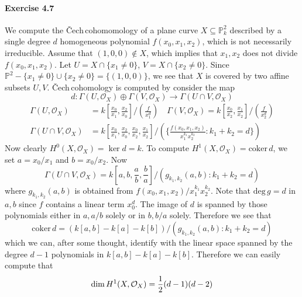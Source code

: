 \documentclass[12pt]{article}
\theoremstyle{plain}
\theoremstyle{definition}
\newcommand{\IP}{\mathbb{P}}
\newcommand{\sO}{\mathcal{O}}
\renewcommand{\deg}{\mathrm{deg\,}}
\renewcommand\dim{{\rm dim\,}}
\newcommand{\coker}{\mathrm{coker\,}}
\newcommand{\<}{\langle}
\renewcommand{\>}{\rangle}
\newcommand{\Cech}{\v{C}ech\,}
\begin{document}
\paragraph{Exercise 4.7}
We compute the \Cech cohomomology of a plane curve $X \subseteq \IP^2_k$ described by a single degree $d$ homogeneous polynomial $f(x_0, x_1, x_2)$, which is not necessarily irreducible. Assume that $(1, 0, 0) \not\in X$, which implies that $x_1, x_2$ does not divide $f(x_0, x_1, x_2)$. Let $U = X \cap \{ x_1 \neq 0 \}$, $V = X \cap \{ x_2 \neq 0 \}$. Since $\IP^2 - \{ x_1 \neq 0\} \cup \{ x_2 \neq 0 \} = \{ (1, 0, 0)\}$, we see that $X$ is covered by two affine subsets $U, V$. \Cech cohomology is computed by consider the map 
$$ d : \Gamma(U, \sO_X) \oplus \Gamma(V, \sO_X) \to \Gamma(U \cap V, \sO_X) $$
\begin{align*}
\Gamma(U, \sO_X) &= k[\frac{x_0}{x_1}, \frac{x_2}{x_0}]/(\frac{f}{x_1^d}) \, \, \, \, \, \,
\Gamma(V, \sO_X) = k[\frac{x_0}{x_2}, \frac{x_1}{x_2}]/(\frac{f}{x_2^d}) \\
\Gamma(U \cap V, \sO_X) &= k[\frac{x_0}{x_1}, \frac{x_2}{x_0}, \frac{x_0}{x_2}, \frac{x_1}{x_2}]/(\{ \frac{f(x_0, x_1, x_2)}{x_1^{k_1} x_2 ^{k_2}} : k_1 + k_2 = d \}) 
\end{align*}
Now clearly $H^0(X, \sO_X) = \ker d = k$. To compute $H^1(X, \sO_X) = \mathrm{coker\,} d$, we set $a = x_0/x_1$ and $b = x_0/x_2$. Now
$$ \Gamma(U \cap V, \sO_X) = k[a, b, \frac{a}{b}, \frac{b}{a}]/ (g_{k_1, k_2}(a, b) : k_1 + k_2 = d )$$
where $g_{k_1, k_2}(a, b)$ is obtained from $f(x_0, x_1, x_2)/x_1^{k_1} x_2^{k_2}$. Note that $\deg g = d$ in $a, b$ since $f$ contains a linear term $x_0^d$. The image of $d$ is spanned by those polynomials either in $a, a/b$ solely or in $b, b/a$ solely. Therefore we see that 
$$ \coker d = (k[a, b] - k[a] - k[b])/(g_{k_1, k_2}(a, b) : k_1 + k_2 = d ) $$
which we can, after some thought, identify with the linear space spanned by the degree $d - 1$ polynomials in $k[a, b] - k[a] - k[b]$. Therefore we can easily compute that 
$$ \dim H^1(X, \sO_X) = \frac{1}{2} (d - 1)(d - 2) $$
\end{document}
